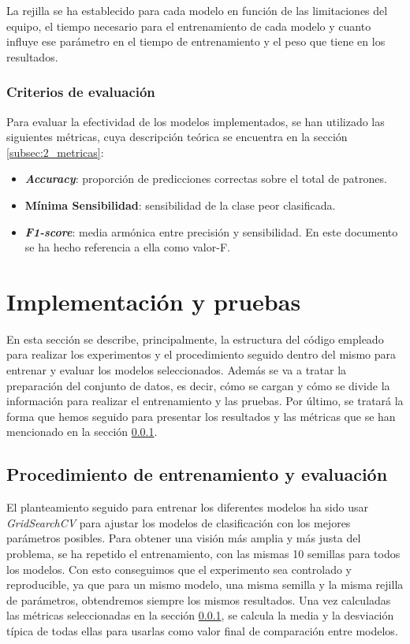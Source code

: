 \vspace{1em}

La rejilla se ha establecido para cada modelo en función de las limitaciones del equipo, el tiempo necesario para el entrenamiento de cada modelo y cuanto influye ese parámetro en el tiempo de entrenamiento y el peso que tiene en los resultados.

\subsubsection{Criterios de evaluación}
\label{subsubsec:evaluacion}

Para evaluar la efectividad de los modelos implementados, se han utilizado las siguientes métricas, cuya descripción teórica se encuentra en la sección \ref{subsec:2_metricas}:

\begin{itemize}
	\item \textbf{\textit{Accuracy}}: proporción de predicciones correctas sobre el total de patrones.
	\item \textbf{Mínima Sensibilidad}: sensibilidad de la clase peor clasificada.
	\item \textbf{\textit{F1-score}}: media armónica entre precisión y sensibilidad. En este documento se ha hecho referencia a ella como valor-F.
\end{itemize}

\section{Implementación y pruebas}
\label{sec:implementacion}

En esta sección se describe, principalmente, la estructura del código empleado para realizar los experimentos y el procedimiento seguido dentro del mismo para entrenar y evaluar los modelos seleccionados. Además se va a tratar la preparación del conjunto de datos, es decir, cómo se cargan y cómo se divide la información para realizar el entrenamiento y las pruebas. Por último, se tratará la forma que hemos seguido para presentar los resultados y las métricas que se han mencionado en la sección \ref{subsubsec:evaluacion}.

\subsection{Procedimiento de entrenamiento y evaluación}
\label{subsec:procedimiento}

El planteamiento seguido para entrenar los diferentes modelos ha sido usar \textit{GridSearchCV} para ajustar los modelos de clasificación con los mejores parámetros posibles. Para obtener una visión más amplia y más justa del problema, se ha repetido el entrenamiento, con las mismas 10 semillas para todos los modelos. Con esto conseguimos que el experimento sea controlado y reproducible, ya que para un mismo modelo, una misma semilla y la misma rejilla de parámetros, obtendremos siempre los mismos resultados. Una vez calculadas las métricas seleccionadas en la sección \ref{subsubsec:evaluacion}, se calcula la media y la desviación típica de todas ellas para usarlas como valor final de comparación entre modelos.

